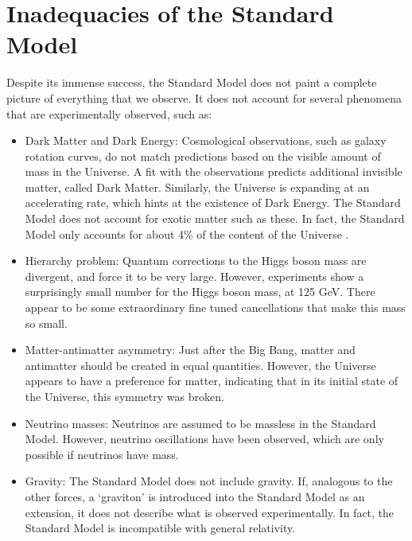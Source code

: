 \documentclass[12pt,a4paper,openright,twoside]{report}
\begin{document}
\section{Inadequacies of the Standard Model}
Despite its immense success, the Standard Model does not paint a complete picture of everything that we observe. It does not account for several phenomena that are experimentally observed, such as:
\begin{itemize}
\item Dark Matter and Dark Energy: Cosmological observations, such as galaxy rotation curves, do not match predictions based on the visible amount of mass in the Universe. A fit with the observations predicts additional invisible matter, called Dark Matter\cite{DM_inc}. Similarly, the Universe is expanding at an accelerating rate, which hints at the existence of Dark Energy\cite{DE}. The Standard Model does not account for exotic matter such as these. In fact, the Standard Model only accounts for about 4\% of the content of the Universe \cite{Planck,DM_comp}.

\item Hierarchy problem\cite{hierarchy1,hierarchy2,hierarchy3,hierarchy4}: Quantum corrections to the Higgs boson mass are divergent, and force it to be very large. However, experiments show a surprisingly small number for the Higgs boson mass, at 125 GeV. There appear to be some extraordinary fine tuned cancellations that make this mass so small.

\item Matter-antimatter asymmetry: Just after the Big Bang, matter and antimatter should be created in equal quantities. However, the Universe appears to have a preference for matter, indicating that in its initial state of the Universe, this symmetry was broken\cite{Baryon_Asymmetry}.

\item Neutrino masses: Neutrinos are assumed to be massless in the Standard Model. However, neutrino oscillations have been observed\cite{neutrino2}, which are only possible if neutrinos have mass\cite{neutrino_mass}.

\item Gravity: The Standard Model does not include gravity. If, analogous to the other forces, a `graviton' is introduced into the Standard Model as an extension, it does not describe what is observed experimentally. In fact, the Standard Model is incompatible with general relativity\cite{grav_inc}.

\end{itemize}
\end{document}
